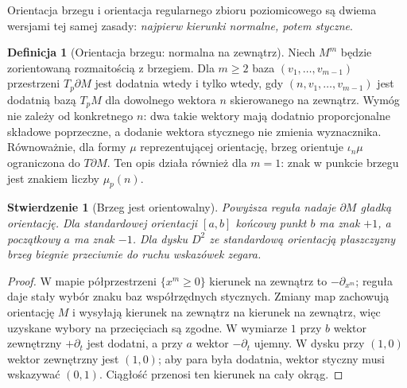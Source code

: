 \documentclass[11pt,a4paper,oneside]{report}
\theoremstyle{plain}
\newtheorem{stwierdzenie}[twierdzenie]{Stwierdzenie}
\theoremstyle{definition}
\newtheorem{definicja}[twierdzenie]{Definicja}
\theoremstyle{remark}
\begin{document}
Orientacja brzegu i orientacja regularnego zbioru
poziomicowego są dwiema wersjami tej samej zasady:
\emph{najpierw kierunki normalne, potem styczne}.

\begin{definicja}[Orientacja brzegu: normalna na zewnątrz]
\label{def:orientacja-brzegu}
Niech $M^m$ będzie zorientowaną rozmaitością z brzegiem.
Dla $m\geq2$ baza $(v_1,\ldots,v_{m-1})$ przestrzeni $T_p\partial M$
jest dodatnia wtedy i tylko wtedy, gdy
$(n,v_1,\ldots,v_{m-1})$ jest dodatnią bazą $T_pM$
dla dowolnego wektora $n$ skierowanego na zewnątrz.
Wymóg nie zależy od konkretnego $n$: dwa takie wektory
mają dodatnio proporcjonalne składowe poprzeczne,
a dodanie wektora stycznego nie zmienia wyznacznika.
Równoważnie, dla formy $\mu$ reprezentującej orientację,
brzeg orientuje $\iota_n\mu$ ograniczona do $T\partial M$.
Ten opis działa również dla $m=1$: znak w punkcie brzegu
jest znakiem liczby $\mu_p(n)$.
\end{definicja}

\begin{stwierdzenie}[Brzeg jest orientowalny]
\label{prop:brzeg-orientowalny}
Powyższa reguła nadaje $\partial M$ gładką orientację.
Dla standardowej orientacji $[a,b]$ końcowy punkt $b$
ma znak $+1$, a początkowy $a$ ma znak $-1$.
Dla dysku $D^2$ ze standardową orientacją płaszczyzny
brzeg biegnie przeciwnie do ruchu wskazówek zegara.
\end{stwierdzenie}
\begin{proof}
W mapie półprzestrzeni $\{x^m\geq0\}$ kierunek
na zewnątrz to $-\partial_{x^m}$; reguła daje
stały wybór znaku baz współrzędnych stycznych.
Zmiany map zachowują orientację $M$ i wysyłają
kierunek na zewnątrz na kierunek na zewnątrz,
więc uzyskane wybory na przecięciach są zgodne.
W wymiarze $1$ przy $b$ wektor zewnętrzny
$+\partial_t$ jest dodatni, a przy $a$ wektor
$-\partial_t$ ujemny. W dysku przy $(1,0)$
wektor zewnętrzny jest $(1,0)$; aby para była
dodatnia, wektor styczny musi wskazywać $(0,1)$.
Ciągłość przenosi ten kierunek na cały okrąg.
\end{proof}
\end{document}
